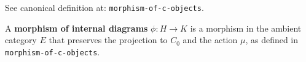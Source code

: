 See canonical definition at: \texttt{morphism-of-c-objects}.

A \textbf{morphism of internal diagrams} $\phi : H \to K$ is a morphism in the ambient category $E$ that preserves the projection to $C_0$ and the action $\mu$, as defined in \texttt{morphism-of-c-objects}.
